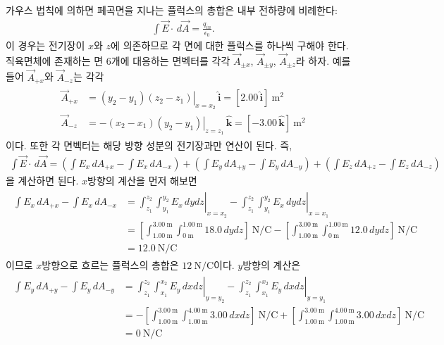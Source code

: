 \documentclass[tightenlines,floatfix,nofootinbib,superscriptaddress,fleqn]{revtex4-2}
\begin{document}
 가우스 법칙에 의하면 페곡면을 지나는 플럭스의 총합은 내부 전하량에
비례한다:
\begin{align}\label{eq:4-1}
  \int \vec{E}\cdot\,d\vec{A} = \frac{q_{in}}{\epsilon_0}.
\end{align}
이 경우는 전기장이 $x$와 $z$에 의존하므로 각 면에 대한 플럭스를 하나씩 구해야 한다.
직육면체에 존재하는 면 6개에 대응하는 면벡터를 각각 $\vec{A}_{\pm x}$, 
$\vec{A}_{\pm y}$, $\vec{A}_{\pm z}$라 하자. 예를 들어 $\vec{A}_{+x}$와
$\vec{A}_{-z}$는 각각
\begin{align}
  \begin{split}
    \vec{A}_{+x} &= \left.\left(y_2-y_1\right)\left(z_2-z_1\right)\right|_{x=x_2}
    \,\hat{\bm{i}}
    =[2.00\,\hat{\bm{i}}]~\mathrm{m^2}  \\
    \vec{A}_{-z} &= -\left.\left(x_2-x_1\right)\left(y_2-y_1\right)\right|_{z=z_1}
    \,\hat{\bm{k}}
    =[-3.00\,\hat{\bm{k}}]~\mathrm{m^2}
  \end{split}
\end{align}
이다. 또한 각 면벡터는 해당 방향 성분의 전기장과만 연산이 된다. 즉,
\begin{align}
  \int \vec{E}\cdot\,d\vec{A} = 
   \left(\int E_x\,d{A_{+x}}-\int E_x\,d{A_{-x}}\right)
  +\left(\int E_y\,d{A_{+y}}-\int E_y\,d{A_{-y}}\right)
  +\left(\int E_z\,d{A_{+z}}-\int E_z\,d{A_{-z}}\right)
\end{align}
을 계산하면 된다. $x$방향의 계산을 먼저 해보면
\begin{align}
  \begin{split}
    \int E_x\,d{A_{+x}}-\int E_x\,d{A_{-x}}
    &=\left.\int^{z_2}_{z_1}\int^{y_2}_{y_1} E_x\,dydz\right|_{x=x_2}
     -\left.\int^{z_2}_{z_1}\int^{y_2}_{y_1} E_x\,dydz\right|_{x=x_1} \\
    &=\left[\int^{3.00~\mathrm{m}}_{1.00~\mathrm{m}}
      \int^{1.00~\mathrm{m}}_{0~\mathrm{m}} 
      18.0\,dydz\right]~\mathrm{N/C}
    -\left[\int^{3.00~\mathrm{m}}_{1.00~\mathrm{m}}
    \int^{1.00~\mathrm{m}}_{0~\mathrm{m}} 
    12.0\,dydz\right]~\mathrm{N/C}  \\
    &=12.0~\mathrm{N/C}
  \end{split}
\end{align}
이므로 $x$방향으로 흐르는 플럭스의 총합은 $12~\mathrm{N/C}$이다. $y$방향의 계산은
\begin{align}
  \begin{split}
    \int E_y\,d{A_{+y}}-\int E_y\,d{A_{-y}}
    &=\left.\int^{z_2}_{z_1}\int^{x_2}_{x_1} E_y\,dxdz\right|_{y=y_2}
     -\left.\int^{z_2}_{z_1}\int^{x_2}_{x_1} E_y\,dxdz\right|_{y=y_1} \\
    &=-\left[\int^{3.00~\mathrm{m}}_{1.00~\mathrm{m}}
    \int^{4.00~\mathrm{m}}_{1.00~\mathrm{m}} 
    3.00\,dxdz\right]~\mathrm{N/C}
    +\left[\int^{3.00~\mathrm{m}}_{1.00~\mathrm{m}}
    \int^{4.00~\mathrm{m}}_{1.00~\mathrm{m}} 
    3.00\,dxdz\right]~\mathrm{N/C}  \\
    &=0~\mathrm{N/C}
  \end{split}
\end{align}
\end{document}
